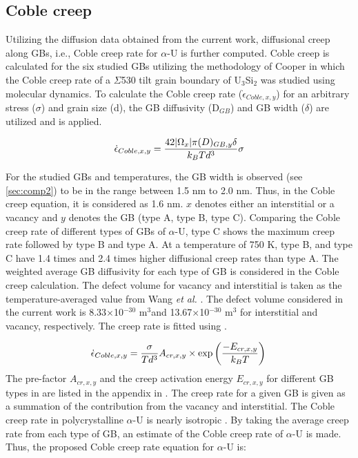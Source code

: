 \documentclass[review]{elsarticle}
\begin{document}
\subsection{Coble creep}

\par Utilizing the diffusion data obtained from the current work, diffusional creep along GBs, i.e., Coble creep \cite{coble} rate for $\alpha$-U is further computed. Coble creep is calculated for the six studied GBs utilizing the methodology of Cooper \cite{USi_diffusion} in which the Coble creep rate of a $\Sigma$530 tilt grain boundary of U$_\mathrm{3}$Si$_\mathrm{2}$ was studied using molecular dynamics. To calculate the Coble creep rate ($\dot{\epsilon}_{Coble,x,y}$) for an arbitrary stress ($\sigma$) and grain size (d), the GB diffusivity (D$_{GB}$) and GB width ($\delta$) are utilized and  is applied. 

\begin{equation}
\label{eq:coble}
\dot{\epsilon}_{Coble,x,y} =\frac{42 |\ohm_{x}| \pi (D )_{GB,y} \delta}{k_{B} T d^{3}} \sigma \\
\end{equation}

\noindent For the studied GBs and temperatures, the GB width is observed (see \cref{sec:comp2}) to be in the range between 1.5 nm to 2.0 nm. Thus, in the Coble creep equation, it is considered as 1.6 nm. $x$ denotes either an interstitial or a vacancy and $y$ denotes the GB (type A, type B, type C). Comparing the Coble creep rate of different types of GBs of $\alpha$-U, type C shows the maximum creep rate followed by type B and type A. At a temperature of 750 K, type B, and type C have 1.4 times and 2.4 times higher diffusional creep rates than type A. The weighted average GB diffusivity for each type of GB is considered in the Coble creep calculation. The defect volume for vacancy and interstitial is taken as the temperature-averaged value from Wang \textit{et al.} \cite{WANG2023154289}. The defect volume considered in the current work is 8.33$\times$10$^{-30}$ m$^\mathrm{3}$and 13.67$\times$10$^{-30}$ m$^\mathrm{3}$ for interstitial and vacancy, respectively. The creep rate is fitted using  \cite{USi_diffusion}. 
 
\begin{equation}
\label{eq:coble1}
\dot{\epsilon}_{Coble,x,y} =\frac{\sigma}{ T d^{3}} A_{cr,x,y} \times \exp\left(\frac{-E_{cr,x,y}}{k_{B} T}\right)\\
\end{equation}
% 
The pre-factor $A_{cr,x,y}$ and the creep activation energy $E_{cr,x,y}$ for different GB types in  are listed in the appendix in . The creep rate for a given GB is given as a summation of the contribution from the vacancy and interstitial. The Coble creep rate in polycrystalline $\alpha$-U is nearly isotropic \cite{calhoun}. By taking the average creep rate from each type of GB, an estimate of the Coble creep rate of $\alpha$-U is made. Thus, the proposed Coble creep rate equation for $\alpha$-U is:
\end{document}
